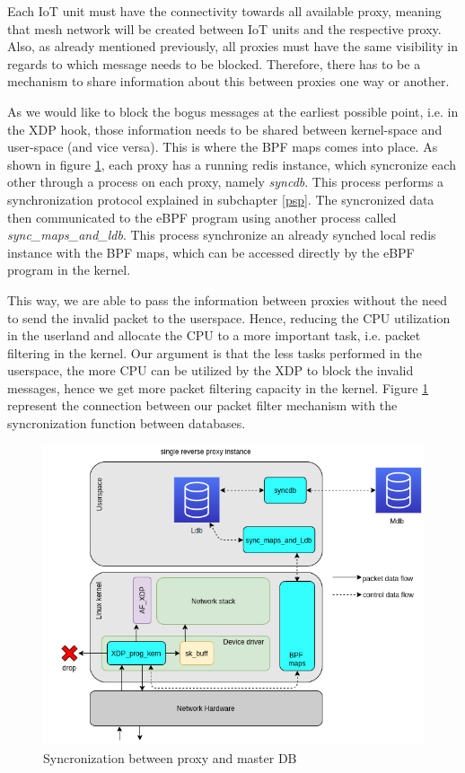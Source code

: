 \documentclass[sigplan,screen]{acmart}
\begin{document}
Each IoT unit must have the connectivity towards all available proxy, meaning that mesh network will be created between IoT units and the respective proxy. Also, as already mentioned previously, all proxies must have the same visibility in regards to which message needs to be blocked. Therefore, there has to be a mechanism to share information about this between proxies one way or another. 

As we would like to block the bogus messages at the earliest possible point, i.e. in the XDP hook, those information needs to be shared between kernel-space and user-space (and vice versa). This is where the BPF maps comes into place. As shown in figure \ref{proxies_xdp}, each proxy has a running redis instance, which syncronize each other through a process on each proxy, namely \textit{syncdb}. This process performs a synchronization protocol explained in subchapter \ref{psp}. The syncronized data then communicated to the eBPF program using another process called \textit{sync\_maps\_and\_ldb}. This process synchronize an already synched local redis instance with the BPF maps, which can be accessed directly by the eBPF program in the kernel.  

This way, we are able to pass the information between proxies without the need to send the invalid packet to the userspace. Hence, reducing the CPU utilization in the userland and allocate the CPU to a more important task, i.e. packet filtering in the kernel. Our argument is that the less tasks performed in the userspace, the more CPU can be utilized by the XDP to block the invalid messages, hence we get more packet filtering capacity in the kernel. Figure \ref{proxies_xdp} represent the connection between our packet filter mechanism with the syncronization function between databases.

\begin{figure}[htbp]
\centerline{\includegraphics[scale=0.35]{pic/proxies_xdp.png}}
\caption{Syncronization between proxy and master DB}
\label{proxies_xdp}
\end{figure}
\end{document}
